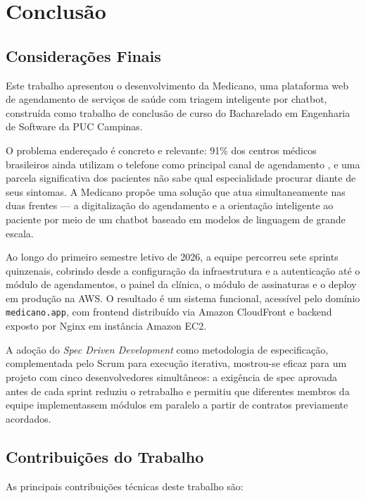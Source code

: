 \chapter{Conclusão}
\label{chap:conclusion}

\section{Considerações Finais}
\label{sec:final-considerations}

Este trabalho apresentou o desenvolvimento da Medicano,
uma plataforma web de agendamento de serviços de saúde
com triagem inteligente por chatbot, construída como
trabalho de conclusão de curso do Bacharelado em
Engenharia de Software da PUC Campinas.

O problema endereçado é concreto e relevante: 91\% dos
centros médicos brasileiros ainda utilizam o telefone
como principal canal de agendamento
\cite{doctoralia2022}, e uma parcela significativa dos
pacientes não sabe qual especialidade procurar diante
de seus sintomas. A Medicano propõe uma solução que
atua simultaneamente nas duas frentes — a digitalização
do agendamento e a orientação inteligente ao paciente
por meio de um chatbot baseado em modelos de linguagem
de grande escala.

Ao longo do primeiro semestre letivo de 2026, a equipe
percorreu sete sprints quinzenais, cobrindo desde a
configuração da infraestrutura e a autenticação até o
módulo de agendamentos, o painel da clínica, o módulo
de assinaturas e o deploy em produção na AWS. O
resultado é um sistema funcional, acessível pelo
domínio \texttt{medicano.app}, com frontend distribuído
via Amazon CloudFront e backend exposto por Nginx em
instância Amazon EC2.

A adoção do \textit{Spec Driven Development} como
metodologia de especificação, complementada pelo Scrum
para execução iterativa, mostrou-se eficaz para um
projeto com cinco desenvolvedores simultâneos: a
exigência de spec aprovada antes de cada sprint reduziu
o retrabalho e permitiu que diferentes membros da
equipe implementassem módulos em paralelo a partir de
contratos previamente acordados.

\section{Contribuições do Trabalho}
\label{sec:contributions}

As principais contribuições técnicas deste trabalho são:

